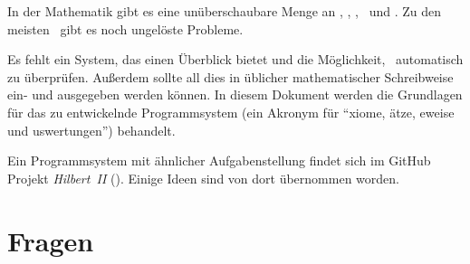 In der Mathematik gibt es eine unüberschaubare Menge an \Axiomen, \Saetzen, \Beweisen, \Fachbegriffen\ und \Fachgebieten.
Zu den meisten \Fachgebieten\ gibt es noch ungelöste Probleme.

Es fehlt ein System, das einen Überblick bietet und die Möglichkeit, \Beweise\ automatisch zu überprüfen.
Außerdem sollte all dies in üblicher mathematischer Schreibweise ein- und ausgegeben werden können.
In diesem Dokument werden die Grundlagen für das zu entwickelnde Programmsystem  (ein Akronym für "`xiome, ätze, eweise und uswertungen"') behandelt.

Ein Programmsystem mit ähnlicher Aufgabenstellung findet sich im GitHub Projekt \emph{Hilbert~II} (\cite{bib:HilbertII, bib:qedeq}).
Einige Ideen sind von dort übernommen worden.

\section     {Fragen}%
\label   {sec:Fragen}

